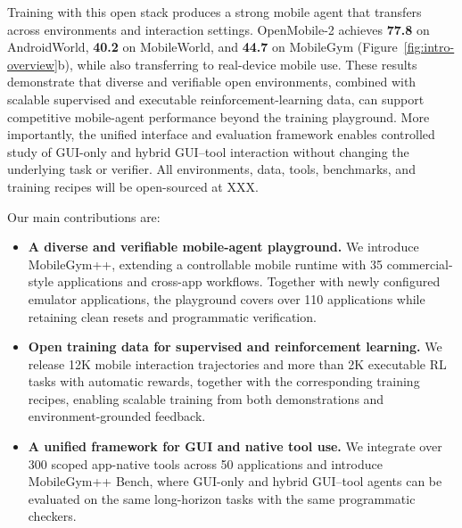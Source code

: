 Training with this open stack produces a strong mobile agent that transfers across environments and interaction settings. OpenMobile-2 achieves \textbf{77.8} on AndroidWorld, \textbf{40.2} on MobileWorld, and \textbf{44.7} on MobileGym (Figure~\ref{fig:intro-overview}b), while also transferring to real-device mobile use. These results demonstrate that diverse and verifiable open environments, combined with scalable supervised and executable reinforcement-learning data, can support competitive mobile-agent performance beyond the training playground. More importantly, the unified interface and evaluation framework enables controlled study of GUI-only and hybrid GUI--tool interaction without changing the underlying task or verifier. All environments, data, tools, benchmarks, and training recipes will be open-sourced at XXX.

Our main contributions are:
\begin{itemize}
\item \textbf{A diverse and verifiable mobile-agent playground.} We introduce MobileGym++, extending a controllable mobile runtime with 35 commercial-style applications and cross-app workflows. Together with newly configured emulator applications, the playground covers over 110 applications while retaining clean resets and programmatic verification.
\item \textbf{Open training data for supervised and reinforcement learning.} We release 12K mobile interaction trajectories and more than 2K executable RL tasks with automatic rewards, together with the corresponding training recipes, enabling scalable training from both demonstrations and environment-grounded feedback.

\item \textbf{A unified framework for GUI and native tool use.} We integrate over 300 scoped app-native tools across 50 applications and introduce MobileGym++ Bench, where GUI-only and hybrid GUI--tool agents can be evaluated on the same long-horizon tasks with the same programmatic checkers.
\end{itemize}